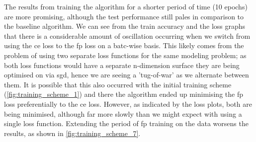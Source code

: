 The results from training the algorithm for a shorter period of time (10 epochs) are more promising, although the test performance still pales in comparison to the baseline algorithm. We can see from the train accuracy and the loss graphs that there is a considerable amount of oscillation occurring when we switch from using the \gls{ce} loss to the \gls{fp} loss on a batc-wise basis. This likely comes from the problem of using two separate loss functions for the same modeling problem; as both loss functions would have a separate n-dimension surface they are being optimised on via \gls{sgd}, hence we are seeing a 'tug-of-war' as we alternate between them. It is possible that this also occurred with the initial training scheme (\ref{fig:training_scheme_1}) and there the algorithm ended up minimising the \gls{fp} loss preferentially to the \gls{ce} loss. However, as indicated by the loss plots, both are being minimised, although far more slowly than we might expect with using a single loss function. Extending the period of \gls{fp} training on the data worsens the results, as shown in \ref{fig:training_scheme_7}.
\bigskip



